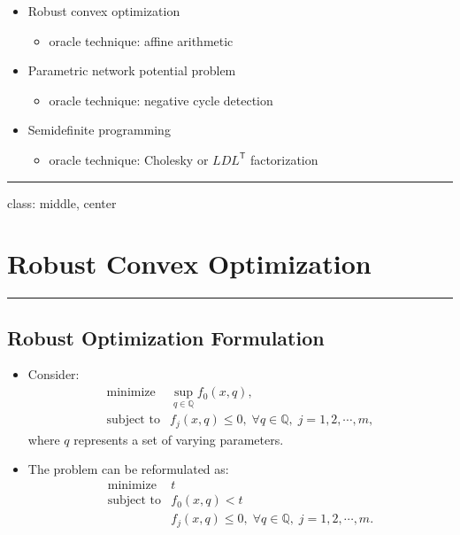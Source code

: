 \documentclass[
]{article}
\providecommand{\tightlist}{%
  \setlength{\itemsep}{0pt}\setlength{\parskip}{0pt}}
\begin{document}
\begin{itemize}
\tightlist
\item
  Robust convex optimization

  \begin{itemize}
  \tightlist
  \item
    oracle technique: affine arithmetic
  \end{itemize}
\item
  Parametric network potential problem

  \begin{itemize}
  \tightlist
  \item
    oracle technique: negative cycle detection
  \end{itemize}
\item
  Semidefinite programming

  \begin{itemize}
  \tightlist
  \item
    oracle technique: Cholesky or \(LDL^\mathsf{T}\) factorization
  \end{itemize}
\end{itemize}

\begin{center}\rule{0.5\linewidth}{0.5pt}\end{center}

class: middle, center

\section{Robust Convex Optimization}\label{robust-convex-optimization}

\begin{center}\rule{0.5\linewidth}{0.5pt}\end{center}

\subsection{Robust Optimization
Formulation}\label{robust-optimization-formulation}

\begin{itemize}
\item
  Consider: \[\begin{array}{ll}
    \text{minimize}   & \sup_{q \in \mathbb Q} f_0(x,q), \\
    \text{subject to} & f_j(x,q) \leq 0, \;
     \forall q \in {\mathbb Q}, \; j = 1,2,\cdots,m,
  \end{array}\] where \(q\) represents a set of varying parameters.
\item
  The problem can be reformulated as: \[\begin{array}{ll}
    \text{minimize}   & t \\
    \text{subject to} & f_0(x,q) < t  \\
    & f_j(x,q) \leq 0, \;
     \forall q \in {\mathbb Q}, \; j = 1,2,\cdots,m.
  \end{array}\]
\end{itemize}
\end{document}
